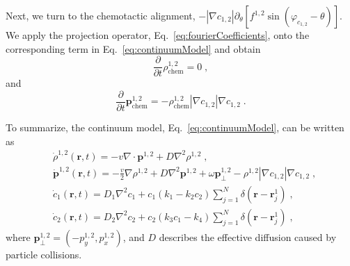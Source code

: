 \documentclass{article}
\begin{document}
Next, we turn to the chemotactic alignment, $-\left| \nabla c_{1,2} \right|\partial _{\theta}\left[ f ^{1,2}\sin \left( \varphi _{c_{1,2}}-\theta \right) \right]$. We apply the projection operator, Eq.~\eqref{eq:fourierCoefficients}, onto the corresponding term in Eq.~\eqref{eq:continuumModel} and obtain
\begin{equation}
    \frac{\partial}{\partial t}\rho _{\mathrm{chem}}^{1,2}=0\;,
\end{equation}
and
\begin{equation}
    \frac{\partial}{\partial t}\boldsymbol{p}_{\mathrm{chem}}^{1,2}=-\rho _{\mathrm{chem}}^{1,2}\left| \nabla c_{1,2} \right|\nabla c_{1,2}\;.
\end{equation}

To summarize, the continuum model, Eq.~\eqref{eq:continuumModel}, can be written as
\begin{subequations}
    \begin{align}
        &\dot{\rho}^{1,2}\left( \mathbf{r},t \right) =-v\nabla \cdot \boldsymbol{p}^{1,2}+D\nabla ^2\rho ^{1,2}\;,\\
        &\dot{\boldsymbol{p}}^{1,2}\left( \mathbf{r},t \right) =-\frac{v}{2}\nabla \rho ^{1,2}+D\nabla ^2\boldsymbol{p}^{1,2}+\omega \boldsymbol{p}_{\bot}^{1,2}-\rho ^{1,2}\left| \nabla c_{1,2} \right|\nabla c_{1,2}\;,\\
        &\dot{c}_1\left( \mathbf{r},t \right) =D_1\nabla ^2c_1+c_1\left( k_1-k_2c_2 \right) \sum_{j=1}^N{\delta \left( \mathbf{r}-\mathbf{r}_{j}^{1} \right) \;,}\\
        &\dot{c}_2\left( \mathbf{r},t \right) =D_2\nabla ^2c_2+c_2\left( k_3c_1-k_4 \right) \sum_{j=1}^N{\delta \left( \mathbf{r}-\mathbf{r}_{j}^{1} \right) \;,}
    \end{align}
\end{subequations}
where $\boldsymbol{p}_{\bot}^{1,2}=\left( -p_{y}^{1,2},p_{x}^{1,2} \right)$, and $D$ describes the effective diffusion caused by particle collisions.
\end{document}
